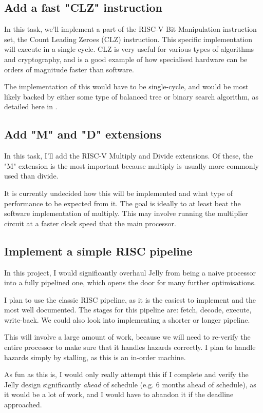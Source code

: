 \documentclass{article}
\begin{document}
\subsection{Add a fast "CLZ" instruction}
In this task, we'll implement a part of the RISC-V Bit Manipulation instruction set, the Count Leading Zeroes
(CLZ) instruction. This specific implementation will execute in a single cycle. CLZ is very useful for
various types of algorithms and cryptography, and is a good example of how specialised hardware can be orders
of magnitude faster than software.

The implementation of this would have to be single-cycle, and would be most likely backed by either some
type of balanced tree or binary search algorithm, as detailed here in \cite{stackoverflow}.

\subsection{Add "M" and "D" extensions}
In this task, I'll add the RISC-V Multiply and Divide extensions. Of these, the "M" extension is the most
important because multiply is usually more commonly used than divide.

It is currently undecided how this will be implemented and what type of performance to be expected from it.
The goal is ideally to at least beat the software implementation of multiply. This may involve running the
multiplier circuit at a faster clock speed that the main processor.

\subsection{Implement a simple RISC pipeline}
In this project, I would significantly overhaul Jelly from being a naive processor into a fully pipelined
one, which opens the door for many further optimisations.

I plan to use the classic RISC pipeline, as it is the easiest to implement and the most well documented. The
stages for this pipeline are: fetch, decode, execute, write-back. We could also look into implementing a
shorter or longer pipeline.

This will involve a large amount of work, because we will need to re-verify the entire processor to make sure
that it handles hazards correctly. I plan to handle hazards simply by stalling, as this is an in-order
machine.

As fun as this is, I would only really attempt this if I complete and verify the Jelly design significantly
\textit{ahead} of schedule (e.g. 6 months ahead of schedule), as it would be a lot of work, and I would have
to abandon it if the deadline approached.
\end{document}
